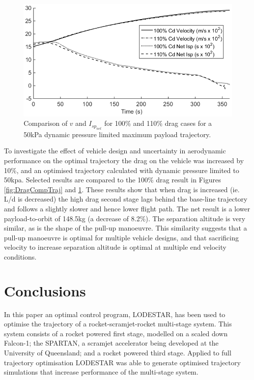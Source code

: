 \documentclass[]{aiaa-tc}
\newcommand{\PayloadToOrbitHighDrag}{148.5}
\begin{document}
\begin{figure}[ht]
	\centering
	\includegraphics[width=.6\linewidth]{DragComparisonOther}
	\caption{Comparison of $v$ and $I_{sp_{net}}$ for 100\% and 110\% drag cases for a 50kPa dynamic pressure limited maximum payload trajectory.}
	\label{fig:DragCompOther}
\end{figure}

To investigate the effect of vehicle design and uncertainty in aerodynamic performance on the optimal trajectory the drag on the vehicle was increased by 10\%, and an optimised trajectory calculated with dynamic pressure limited to 50kpa. Selected results are compared to the 100\% drag result in Figures \ref{fig:DragCompTraj} and \ref{fig:DragCompOther}. These results show that when drag is increased (ie. L/d is decreased) the high drag second stage lags behind the base-line trajectory and follows a slightly slower and hence lower flight path. The net result is  a lower payload-to-orbit of \PayloadToOrbitHighDrag kg (a decrease of 8.2\%). The separation altitude is very similar, as is the shape of the pull-up manoeuvre.
This similarity suggests that a pull-up manoeuvre is optimal for multiple vehicle designs, and that sacrificing velocity to increase separation altitude is optimal at multiple end velocity conditions. 

 


\section{Conclusions}


In this paper an optimal control program, LODESTAR, has been used to optimise the trajectory of a rocket-scramjet-rocket multi-stage system. This system consists of a rocket powered first stage, modelled on a scaled down Falcon-1; the SPARTAN, a scramjet accelerator being developed at the University of Queensland; and a rocket powered third stage. Applied to full trajectory optimisation LODESTAR was able to generate optimised trajectory simulations that increase performance of the multi-stage system.
\end{document}
